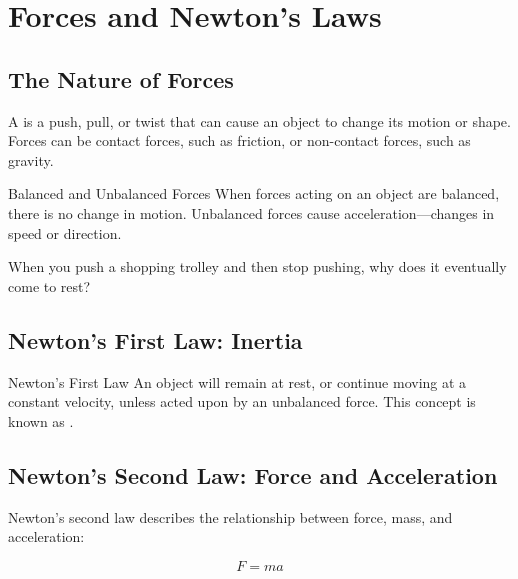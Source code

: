 \section{Forces and Newton's Laws}

\subsection{The Nature of Forces}

A  is a push, pull, or twist that can cause an object to change its motion or shape. Forces can be contact forces, such as friction, or non-contact forces, such as gravity.

\begin{keyconcept}{Balanced and Unbalanced Forces}
When forces acting on an object are balanced, there is no change in motion. Unbalanced forces cause acceleration—changes in speed or direction.
\end{keyconcept}

\begin{stopandthink}
When you push a shopping trolley and then stop pushing, why does it eventually come to rest?
\end{stopandthink}

\subsection{Newton's First Law: Inertia}

\begin{keyconcept}{Newton's First Law}
An object will remain at rest, or continue moving at a constant velocity, unless acted upon by an unbalanced force. This concept is known as .
\end{keyconcept}


\subsection{Newton's Second Law: Force and Acceleration}

Newton's second law describes the relationship between force, mass, and acceleration:

\[
F = ma
\]


